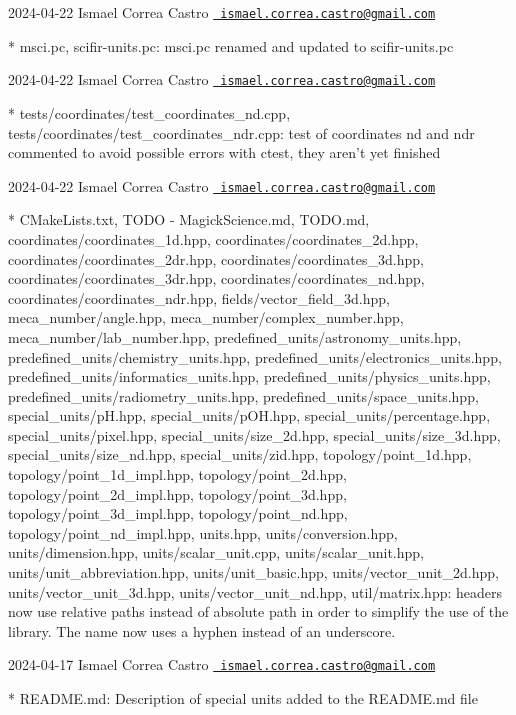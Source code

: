  2024-\/04-\/22 Ismael Correa Castro \href{mailto:ismael.correa.castro@gmail.com}{\texttt{ ismael.\+correa.\+castro@gmail.\+com}} \begin{DoxyVerb}* msci.pc, scifir-units.pc: msci.pc renamed and updated to
scifir-units.pc
\end{DoxyVerb}
 2024-\/04-\/22 Ismael Correa Castro \href{mailto:ismael.correa.castro@gmail.com}{\texttt{ ismael.\+correa.\+castro@gmail.\+com}} \begin{DoxyVerb}* tests/coordinates/test_coordinates_nd.cpp,
tests/coordinates/test_coordinates_ndr.cpp: test of coordinates nd
and ndr commented to avoid possible errors with ctest, they aren't
yet finished
\end{DoxyVerb}
 2024-\/04-\/22 Ismael Correa Castro \href{mailto:ismael.correa.castro@gmail.com}{\texttt{ ismael.\+correa.\+castro@gmail.\+com}} \begin{DoxyVerb}* CMakeLists.txt, TODO - MagickScience.md, TODO.md,
coordinates/coordinates_1d.hpp, coordinates/coordinates_2d.hpp,
coordinates/coordinates_2dr.hpp, coordinates/coordinates_3d.hpp,
coordinates/coordinates_3dr.hpp, coordinates/coordinates_nd.hpp,
coordinates/coordinates_ndr.hpp, fields/vector_field_3d.hpp,
meca_number/angle.hpp, meca_number/complex_number.hpp,
meca_number/lab_number.hpp, predefined_units/astronomy_units.hpp,
predefined_units/chemistry_units.hpp,
predefined_units/electronics_units.hpp,
predefined_units/informatics_units.hpp,
predefined_units/physics_units.hpp,
predefined_units/radiometry_units.hpp,
predefined_units/space_units.hpp, special_units/pH.hpp,
special_units/pOH.hpp, special_units/percentage.hpp,
special_units/pixel.hpp, special_units/size_2d.hpp,
special_units/size_3d.hpp, special_units/size_nd.hpp,
special_units/zid.hpp, topology/point_1d.hpp,
topology/point_1d_impl.hpp, topology/point_2d.hpp,
topology/point_2d_impl.hpp, topology/point_3d.hpp,
topology/point_3d_impl.hpp, topology/point_nd.hpp,
topology/point_nd_impl.hpp, units.hpp, units/conversion.hpp,
units/dimension.hpp, units/scalar_unit.cpp, units/scalar_unit.hpp,
units/unit_abbreviation.hpp, units/unit_basic.hpp,
units/vector_unit_2d.hpp, units/vector_unit_3d.hpp,
units/vector_unit_nd.hpp, util/matrix.hpp: headers now use relative
paths instead of absolute path in order to simplify the use of the
library. The name now uses a hyphen instead of an underscore.
\end{DoxyVerb}
 2024-\/04-\/17 Ismael Correa Castro \href{mailto:ismael.correa.castro@gmail.com}{\texttt{ ismael.\+correa.\+castro@gmail.\+com}} \begin{DoxyVerb}* README.md: Description of special units added to the README.md
file
\end{DoxyVerb}
